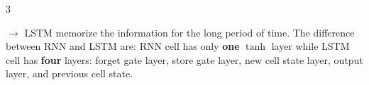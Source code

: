 \documentclass[letterpaper, 10.5pt,landscape]{article}
\begin{document}
\begin{multicols*}{3}













$\rightarrow$ LSTM memorize the information for the long period of time. The difference between RNN and LSTM are: RNN cell has only \textbf{one} $\tanh$ layer while LSTM cell has \textbf{four} layers: forget gate layer, store gate layer, new cell state layer, output layer, and previous cell state.




\end{multicols*}
\end{document}
